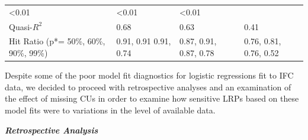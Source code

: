 \documentclass[
]{article}
\begin{document}
\begin{longtable}[]{@{}llll@{}}
\begin{minipage}[t]{0.17\columnwidth}
\textless0.01\strut
\end{minipage} & \begin{minipage}[t]{0.21\columnwidth}\raggedright
\textless0.01\strut
\end{minipage} & \begin{minipage}[t]{0.21\columnwidth}\raggedright
\textless0.01\strut
\end{minipage}\tabularnewline
\begin{minipage}[t]{0.30\columnwidth}\raggedright
Quasi-\(R^2\)\strut
\end{minipage} & \begin{minipage}[t]{0.17\columnwidth}\raggedright
0.68\strut
\end{minipage} & \begin{minipage}[t]{0.21\columnwidth}\raggedright
0.63\strut
\end{minipage} & \begin{minipage}[t]{0.21\columnwidth}\raggedright
0.41\strut
\end{minipage}\tabularnewline
\begin{minipage}[t]{0.30\columnwidth}\raggedright
Hit Ratio (p*= 50\%, 60\%, 90\%, 99\%)\strut
\end{minipage} & \begin{minipage}[t]{0.17\columnwidth}\raggedright
0.91, 0.91 0.91, 0.74\strut
\end{minipage} & \begin{minipage}[t]{0.21\columnwidth}\raggedright
0.87, 0.91, 0.87, 0.78\strut
\end{minipage} & \begin{minipage}[t]{0.21\columnwidth}\raggedright
0.76, 0.81, 0.76, 0.52\strut
\end{minipage}\tabularnewline
\bottomrule
\end{longtable}

Despite some of the poor model fit diagnostics for logistic regressions
fit to IFC data, we decided to proceed with retrospective analyses and
an examination of the effect of missing CUs in order to examine how
sensitive LRPs based on these model fits were to variations in the level
of available data.

\textbf{\emph{Retrospective Analysis}}
\end{document}
